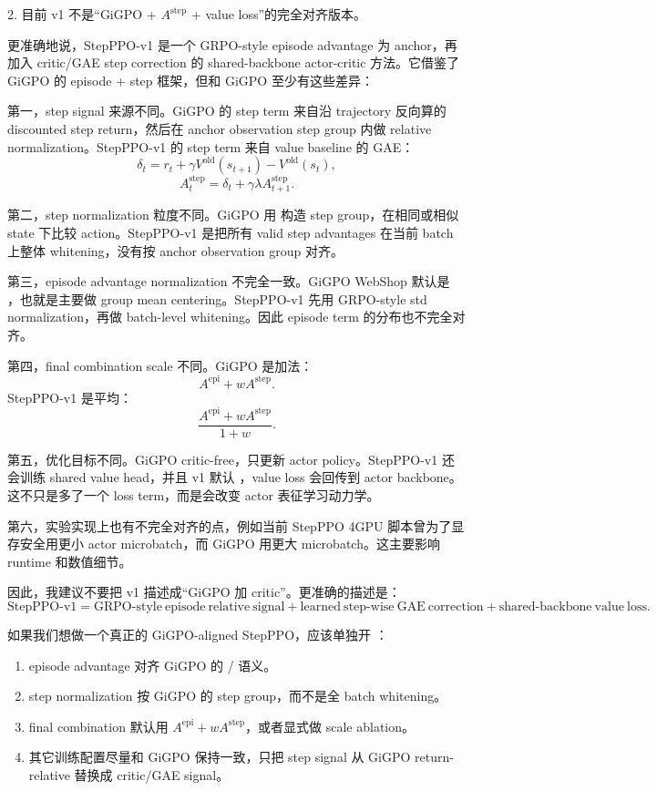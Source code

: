 \documentclass[10pt]{ctexart}
\begin{document}
2. 目前 v1 不是“GiGPO + $A^{\mathrm{step}}$ + value loss”的完全对齐版本。

更准确地说，StepPPO-v1 是一个 GRPO-style episode advantage 为 anchor，再加入 critic/GAE step correction 的 shared-backbone actor-critic 方法。它借鉴了 GiGPO 的 episode + step 框架，但和 GiGPO 至少有这些差异：

第一，step signal 来源不同。GiGPO 的 step term 来自沿 trajectory 反向算的 discounted step return，然后在 anchor observation step group 内做 relative normalization。StepPPO-v1 的 step term 来自 value baseline 的 GAE：
\[
\delta_t
=
r_t + \gamma V^{\mathrm{old}}(s_{t+1}) - V^{\mathrm{old}}(s_t),
\]
\[
A_t^{\mathrm{step}}
=
\delta_t + \gamma\lambda A_{t+1}^{\mathrm{step}}.
\]

第二，step normalization 粒度不同。GiGPO 用  构造 step group，在相同或相似 state 下比较 action。StepPPO-v1 是把所有 valid step advantages 在当前 batch 上整体 whitening，没有按 anchor observation group 对齐。

第三，episode advantage normalization 不完全一致。GiGPO WebShop 默认是 ，也就是主要做 group mean centering。StepPPO-v1 先用 GRPO-style std normalization，再做 batch-level whitening。因此 episode term 的分布也不完全对齐。

第四，final combination scale 不同。GiGPO 是加法：
\[
A^{\mathrm{epi}} + w A^{\mathrm{step}}.
\]
StepPPO-v1 是平均：
\[
\frac{A^{\mathrm{epi}} + w A^{\mathrm{step}}}{1+w}.
\]

第五，优化目标不同。GiGPO critic-free，只更新 actor policy。StepPPO-v1 还会训练 shared value head，并且 v1 默认 ，value loss 会回传到 actor backbone。这不只是多了一个 loss term，而是会改变 actor 表征学习动力学。

第六，实验实现上也有不完全对齐的点，例如当前 StepPPO 4GPU 脚本曾为了显存安全用更小 actor microbatch，而 GiGPO 用更大 microbatch。这主要影响 runtime 和数值细节。

因此，我建议不要把 v1 描述成“GiGPO 加 critic”。更准确的描述是：
\[
\mathrm{StepPPO\text{-}v1}
=
\mathrm{GRPO\text{-}style\ episode\ relative\ signal}
+
\mathrm{learned\ step\text{-}wise\ GAE\ correction}
+
\mathrm{shared\text{-}backbone\ value\ loss}.
\]

如果我们想做一个真正的 GiGPO-aligned StepPPO，应该单独开 ：
\begin{enumerate}
\item episode advantage 对齐 GiGPO 的  /  语义。
\item step normalization 按 GiGPO 的  step group，而不是全 batch whitening。
\item final combination 默认用 $A^{\mathrm{epi}} + wA^{\mathrm{step}}$，或者显式做 scale ablation。
\item 其它训练配置尽量和 GiGPO 保持一致，只把 step signal 从 GiGPO return-relative 替换成 critic/GAE signal。
\end{enumerate}
\end{document}
